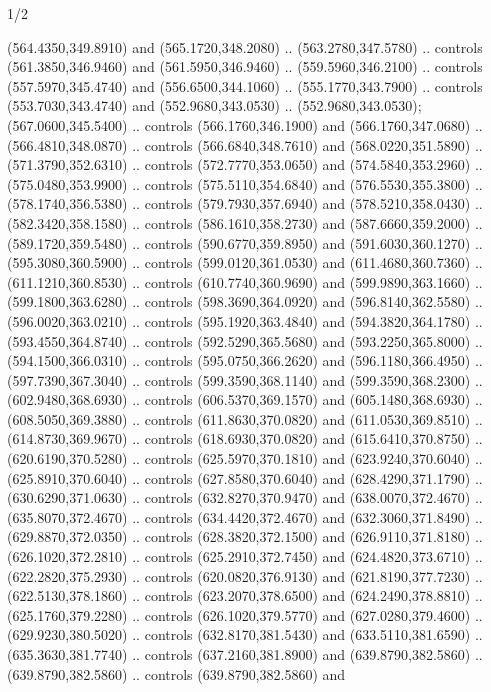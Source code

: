 \begin{flagdescription}{1/2}
\begin{scope}[xshift=0.5\flaglength,yshift=0.5\flagwidth,scale=\flagwidth/759]
\begin{scope}[y=0.8pt, x=0.8pt, yscale=-1,shift={(-720,-480)}]
\begin{scope}[cm={{1.14637,0.0,0.0,1.17117,(33.17849,82.1384)}}]
  (564.4350,349.8910) and (565.1720,348.2080) .. (563.2780,347.5780) .. controls
  (561.3850,346.9460) and (561.5950,346.9460) .. (559.5960,346.2100) .. controls
  (557.5970,345.4740) and (556.6500,344.1060) .. (555.1770,343.7900) .. controls
  (553.7030,343.4740) and (552.9680,343.0530) .. (552.9680,343.0530);
\path[fill=c6dbe45] %
  (567.0600,345.5400) .. controls (566.1760,346.1900) and
  (566.1760,347.0680) .. (566.4810,348.0870) .. controls (566.6840,348.7610) and
  (568.0220,351.5890) .. (571.3790,352.6310) .. controls (572.7770,353.0650) and
  (574.5840,353.2960) .. (575.0480,353.9900) .. controls (575.5110,354.6840) and
  (576.5530,355.3800) .. (578.1740,356.5380) .. controls (579.7930,357.6940) and
  (578.5210,358.0430) .. (582.3420,358.1580) .. controls (586.1610,358.2730) and
  (587.6660,359.2000) .. (589.1720,359.5480) .. controls (590.6770,359.8950) and
  (591.6030,360.1270) .. (595.3080,360.5900) .. controls (599.0120,361.0530) and
  (611.4680,360.7360) .. (611.1210,360.8530) .. controls (610.7740,360.9690) and
  (599.9890,363.1660) .. (599.1800,363.6280) .. controls (598.3690,364.0920) and
  (596.8140,362.5580) .. (596.0020,363.0210) .. controls (595.1920,363.4840) and
  (594.3820,364.1780) .. (593.4550,364.8740) .. controls (592.5290,365.5680) and
  (593.2250,365.8000) .. (594.1500,366.0310) .. controls (595.0750,366.2620) and
  (596.1180,366.4950) .. (597.7390,367.3040) .. controls (599.3590,368.1140) and
  (599.3590,368.2300) .. (602.9480,368.6930) .. controls (606.5370,369.1570) and
  (605.1480,368.6930) .. (608.5050,369.3880) .. controls (611.8630,370.0820) and
  (611.0530,369.8510) .. (614.8730,369.9670) .. controls (618.6930,370.0820) and
  (615.6410,370.8750) .. (620.6190,370.5280) .. controls (625.5970,370.1810) and
  (623.9240,370.6040) .. (625.8910,370.6040) .. controls (627.8580,370.6040) and
  (628.4290,371.1790) .. (630.6290,371.0630) .. controls (632.8270,370.9470) and
  (638.0070,372.4670) .. (635.8070,372.4670) .. controls (634.4420,372.4670) and
  (632.3060,371.8490) .. (629.8870,372.0350) .. controls (628.3820,372.1500) and
  (626.9110,371.8180) .. (626.1020,372.2810) .. controls (625.2910,372.7450) and
  (624.4820,373.6710) .. (622.2820,375.2930) .. controls (620.0820,376.9130) and
  (621.8190,377.7230) .. (622.5130,378.1860) .. controls (623.2070,378.6500) and
  (624.2490,378.8810) .. (625.1760,379.2280) .. controls (626.1020,379.5770) and
  (627.0280,379.4600) .. (629.9230,380.5020) .. controls (632.8170,381.5430) and
  (633.5110,381.6590) .. (635.3630,381.7740) .. controls (637.2160,381.8900) and
  (639.8790,382.5860) .. (639.8790,382.5860) .. controls (639.8790,382.5860) and

\end{scope}
\end{scope}
\end{scope}
\end{flagdescription}

